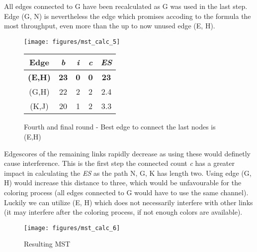       All edges connected to G have been recalculated as G was used in the last step. Edge (G, N) is nevertheless the edge which promises accoding to 
      the formula the most throughput, even more than the up to now unused edge (E, H).
      
      \begin{figure}[h!]
	\centering
	\begin{minipage}{7.5cm}
	  \texttt{[image: figures/mst\_calc\_5]}
	\end{minipage}
	\begin{minipage}{4cm}
	  \begin{tabular}{c||c|c|c||c}
	    Edge & \textit{b} & \textit{i} & \textit{c} & \textit{ES}\\ \hline\hline
	    \textbf{(E,H)} & \textbf{23} & \textbf{0} & \textbf{0} & \textbf{23} \\ \hline
	    (G,H) & 22 & 2 & 2 & 2.4 \\ \hline
	    (K,J) & 20 & 1 & 2 & 3.3 \\ \hline
	  \end{tabular}
	\end{minipage}
	\caption{Fourth and final round - Best edge to connect the last nodes is (E,H)}
	\label{fig:mst_calc_5}
      \end{figure}
      
      Edgescores of the remaining links rapidly decrease as using these would definetly cause interference.
      This is the first step the connected count \textit{c} has a greater impact in calculating the \textit{ES} as the path N, G, K has length two.
      Using edge (G, H) would increase this distance to three, which would be unfavourable for the coloring process (all edges connected to G would have to use the same channel).
      Luckily we can utilize (E, H) which does not necessarily interfere with other links (it may interfere after the coloring process, if not enough colors are available).
      
      \begin{figure}[h!]
	\centering
	\begin{minipage}{7.5cm}
	  \texttt{[image: figures/mst\_calc\_6]}
	\end{minipage}
	\begin{minipage}{4cm}
	  \hspace{4cm}
	\end{minipage}
	\caption{Resulting MST}
	\label{fig:mst_calc_6}
      \end{figure}  
     \newpage
      
